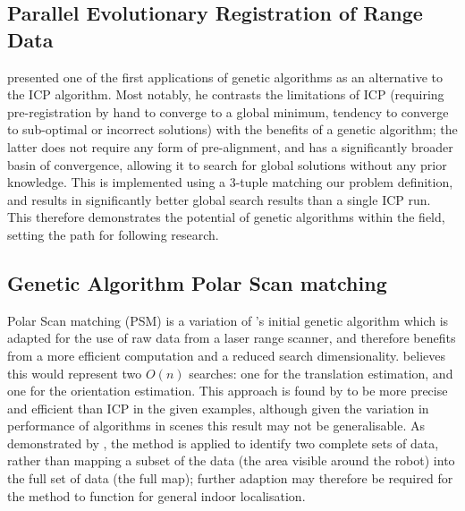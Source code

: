 \documentclass[authoryearcitations]{UoYCSproject}
\begin{document}
\subsection{Parallel Evolutionary Registration of Range Data}
\citet{Robertson2002-ou} presented one of the first applications of genetic algorithms as an alternative to the ICP algorithm. Most notably, he contrasts the limitations of ICP (requiring pre-registration by hand to converge to a global minimum, tendency to converge to sub-optimal or incorrect solutions) with the benefits of a genetic algorithm; the latter does not require any form of pre-alignment, and has a significantly broader basin of convergence, allowing it to search for global solutions without any prior knowledge. This is implemented using a 3-tuple matching our problem definition, and results in significantly better global search results than a single ICP run. This therefore demonstrates the potential of genetic algorithms within the field, setting the path for following research.

\subsection{Genetic Algorithm Polar Scan matching}
Polar Scan matching (PSM) is a variation of \citeauthor{Robertson2002-ou}'s initial genetic algorithm which is adapted for the use of raw data from a laser range scanner, and therefore benefits from a more efficient computation and a reduced search dimensionality. \citet{Ze-Su2007-li} believes this would represent two $O(n)$ searches: one for the translation estimation, and one for the orientation estimation. This approach is found by \citeauthor{Ze-Su2007-li} to be more precise and efficient than ICP in the given examples, although given the variation in performance of algorithms in scenes \cite{Donoso2017-wp} this result may not be generalisable. As demonstrated by \citeauthor{Ze-Su2007-li}, the method is applied to identify two complete sets of data, rather than mapping a subset of the data (the area visible around the robot) into the full set of data (the full map); further adaption may therefore be required for the method to function for general indoor localisation.
\end{document}

